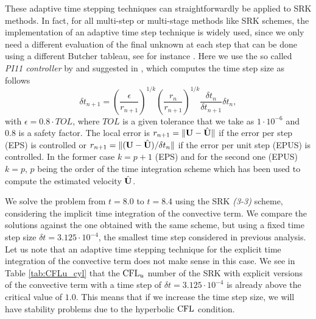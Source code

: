 These adaptive time stepping techniques can straightforwardly be applied to SRK methods. In fact, for all multi-step or multi-stage methods like SRK schemes, the implementation of an adaptive time step technique is widely used, since we only need a different evaluation of the final unknown at each step that can be done using a different Butcher tableau, see for instance \cite{gustafsson_control_1991,gustafsson_control-theoretic_1994}. Here we use the so called \textit{PI11 controller} by \cite{soderlind_automatic_2002} and suggested in \cite{gustafsson_control-theoretic_1994}, which computes the time step size as follows
$$\delta t_{n+1}=\left(\frac{\epsilon}{r_{n+1}}\right)^{1/k}\left(\frac{r_n}{r_{n+1}}\right)^{1/k}\frac{\delta t_n}{\delta t_{n+1}}\delta t_n,$$
with $\epsilon=0.8\cdot TOL$, where $TOL$ is a given tolerance that we take as $1\cdot10^{-6}$ and $0.8$ is a safety factor. The local error is $r_{n+1}=\|{\bf U}-\hat{{\bf U}}\|$ if the error per step (EPS) is controlled or $r_{n+1}=\|({\bf U}-\hat{{\bf U}})/\delta t_n\|$ if the error per unit step (EPUS) is controlled. In the former case $k=p+1$ (EPS) and for the second one (EPUS) $k=p$, $p$ being the order of the time integration scheme which has been used to compute the estimated velocity $\hat{{\bf U}}$.

We solve the problem from $t=8.0$ to $t=8.4$ using the SRK \textit{(3-3)} scheme, considering the implicit time integration of the convective term. We compare the solutions against the one obtained with the same scheme, but using a fixed time step size $\delta t=3.125\cdot10^{-4}$, the smallest time step considered in previous analysis. Let us note that an adaptive time stepping technique for the explicit time integration of the convective term does not make sense in this case. We see in Table \ref{tab:CFLu_cyl} that the ${\rm CFL}_u$ number of the SRK with explicit versions of the convective term with a time step of $\delta t=3.125\cdot10^{-4}$ is already above the critical value of $1.0$. This means that if we increase the time step size, we will have stability problems due to the hyperbolic ${\rm CFL}$ condition. 

